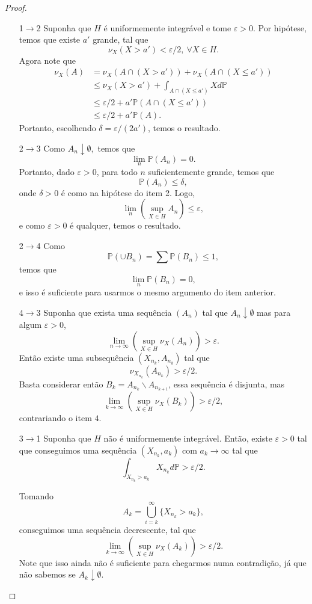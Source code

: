 \documentclass[12pt,a4paper,oneside]{book}
\theoremstyle{definition}
\theoremstyle{remark}
\numberwithin{equation}{section}
\newcommand{\e}{\varepsilon}
\newcommand{\pr}{\mathbb{P}}
\begin{document}
\begin{proof}
$ $
\begin{itemize}
\item[1$\rightarrow$2] Suponha que $H$ é uniformemente integrável e tome $\e>0.$ Por hipótese, temos que existe $a'$ grande, tal que
$$\nu_X(X>a')<\e/2,\ \forall X\in H. $$
Agora note que
\begin{align*}
\nu_X(A) &= \nu_X(A\cap(X>a'))+\nu_X(A\cap(X\leq a'))\\
&\leq \nu_X(X>a') + \int_{A\cap (X\leq a')}Xd\pr \\
&\leq  \e/2 + a'\pr(A\cap(X\leq a'))\\
&\leq \e/2 + a'\pr(A).
\end{align*}
Portanto, escolhendo $\delta = \e/(2a')$, temos o resultado.
\item[2$\rightarrow$3] Como $A_n\downarrow \emptyset,$ temos que
$$\lim_n \pr(A_n)=0. $$
Portanto, dado $\e>0$, para todo $n$ suficientemente grande, temos que
$$\pr(A_n)\leq \delta, $$
onde $\delta>0$ é como na hipótese do item 2. Logo,
$$\lim_n (\sup_{X\in H}A_n)\leq \e, $$
e como $\e>0$ é qualquer, temos o resultado.
\item[2$\rightarrow$4] Como
$$\pr(\cup B_n) = \sum \pr(B_n) \leq 1, $$
temos que 
$$\lim_n \pr(B_n) = 0,$$
e isso é suficiente para usarmos o mesmo argumento do item anterior.

\item[4$\rightarrow$3] Suponha que exista uma sequência $(A_n)$ tal que $A_n\downarrow \emptyset$ mas para algum $\e>0$,
$$\lim_{n\rightarrow \infty} \left( \sup_{X\in H} \nu_X(A_n)\right) >\e.$$
Então existe uma subsequência $(X_{n_k},A_{n_k})$ tal que
$$\nu_{X_{n_k}}(A_{n_k})> \e/2. $$
Basta considerar então $B_k = A_{n_k}\backslash A_{n_{k+1}}$, essa sequência é disjunta, mas 
$$\lim_{k\rightarrow \infty} \left( \sup_{X\in H} \nu_X(B_k)\right) >\e/2,$$
contrariando o item  $4.$

\item[3$\rightarrow$1] Suponha que $H$ não é uniformemente integrável. Então, existe $\e>0$ tal que conseguimos uma sequência $(X_{n_k},a_k)$ com $a_k\rightarrow \infty$ tal que
$$\int_{X_{n_k}>a_k}X_{n_k}d\pr >\e/2. $$ 

Tomando 
$$A_k = \bigcup_{i=k}^\infty \{X_{n_k}>a_k\}, $$
conseguimos uma sequência decrescente, tal que
$$\lim_{k\rightarrow \infty} \left( \sup_{X\in H} \nu_X(A_k)\right) >\e/2.$$
Note que isso ainda não é suficiente para chegarmos numa contradição, já que não sabemos se $A_k\downarrow \emptyset.$


\end{itemize}
\end{proof}
\end{document}
